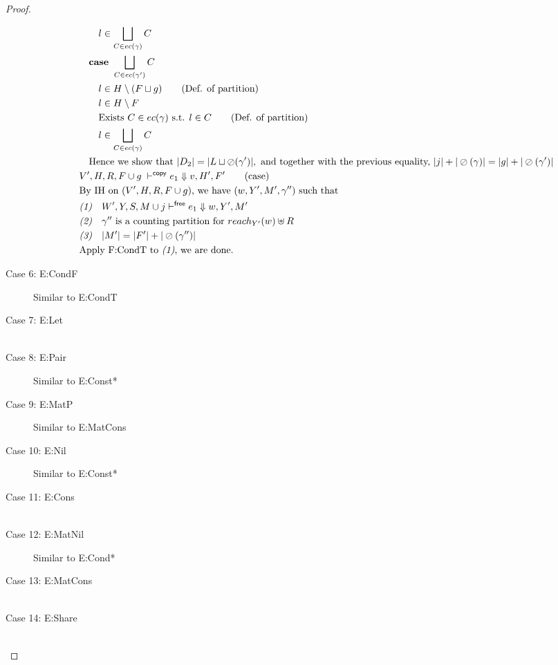 \documentclass[11pt]{article}
\newcommand{\oh}[1]{\oslash(#1)}
\theoremstyle{definition}
\begin{document}
\begin{proof}
\begin{description}
\begin{align*}
		&\quad\quad l \in \bigsqcup_{C \in ec(\gamma)} C\\
		&\quad\textbf{case } \bigsqcup_{C \in ec(\gamma')} C\\
		&\quad\quad l \in H \setminus (F \sqcup g) \tag{Def. of partition}\\
		&\quad\quad l \in H \setminus F \\
		&\quad\quad \text{Exists } C \in ec(\gamma) \text{ s.t. } l \in C \tag{Def. of partition}\\
		&\quad\quad l \in \bigsqcup_{C \in ec(\gamma)} C\\
		&\quad\text{Hence we show that } |D_2| = |L \sqcup \oh{\gamma'}|, \text{ and together with the previous 
		equality, } |j| + |\oh{\gamma}| = |g| + |\oh{\gamma'}|\\
  	&V',H,R,F \cup g\; \vdash^{\mathsf{copy}} e_1 \Downarrow v, H',F' \tag{case}\\
		&\text{By IH on $(V',H,R,F\cup g)$, we have } (w,Y',M',\gamma'') \text{ such that }\\
		&\emph{(1)}\quad  W',Y,S,M \cup j  \vdash^{\mathsf{free}} e_1 \Downarrow w,Y',M'\\
		&\emph{(2)}\quad \gamma'' \text{ is a counting partition for } reach_{Y'}(w) \uplus R\\
		&\emph{(3)}\quad |M'| = |F'| + |\oh{\gamma''}|\\
		&\text{Apply F:CondT to \emph{(1)}, we are done.}
  \end{align*}
  \item[Case 6: E:CondF] 
  Similar to E:CondT
  \item[Case 7: E:Let]
  \begin{align*}
  \end{align*}
	\item[Case 8: E:Pair]
  Similar to E:Const*
  \item[Case 9: E:MatP]
  Similar to E:MatCons
  \item[Case 10: E:Nil]
  Similar to E:Const*
  \item[Case 11: E:Cons]
  \begin{align*}
  \end{align*}
  \item[Case 12: E:MatNil]
  Similar to E:Cond*
  \item[Case 13: E:MatCons]
  \begin{align*}
  \end{align*}
  \item[Case 14: E:Share]
	\begin{align*}

\end{align*}
\end{description}
\end{proof}
\end{document}
